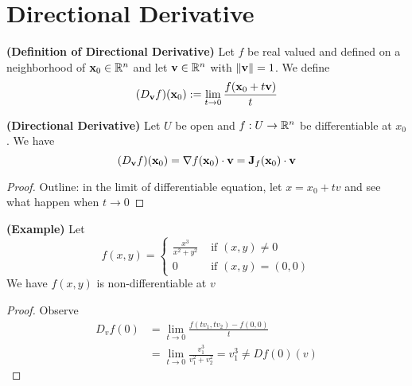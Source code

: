 \documentclass{report}
\begin{document}
\section{Directional Derivative}
\begin{definition}
\label{4.4.1}
  \textbf{(Definition of Directional Derivative)} Let $f$ be real valued and defined on a neighborhood of $\textbf{x}_0 \in\mathbb{R}^n$ and let $\textbf{v}\in\mathbb{R}^n$ with $\| \textbf{v} \|=1$. We define 
  \begin{equation}
    (D_{\textbf{v}}f)(\textbf{x}_0):=\lim_{t\to 0}\frac{f(\textbf{x}_0+t\textbf{v})}{t}
  \end{equation}
\end{definition}
\begin{theorem}
\label{4.4.2}
\textbf{(Directional Derivative)} Let $U$ be open and $f:U\rightarrow \mathbb{R}^n$ be differentiable at $x_0$. We have
 \begin{equation}
   (D_{\textbf{v}}f)(\textbf{x}_0)=\nabla f(\textbf{x}_0)\cdot \textbf{v}=\textbf{J}_f(\textbf{x}_0)\cdot \textbf{v}
\end{equation}
\end{theorem}
\begin{proof}
Outline: in the limit of differentiable equation, let $x=x_0+tv$ and see what happen when  $t \to 0$
\end{proof}
\begin{theorem}
\label{4.4.3}
\textbf{(Example)} Let
\begin{equation}
f(x,y)=\begin{cases}
  \frac{x^3}{x^2+y^2}& \text{ if  }(x,y)\neq 0\\
  0 & \text{ if  }(x,y)=(0,0)
\end{cases}
\end{equation}
We have $f(x,y)$ is non-differentiable at $v$
\end{theorem}
\begin{proof}
Observe
\begin{align}
D_vf(0)&=\lim_{t \to 0}\frac{f(tv_1,tv_2)-f(0,0)}{t}\\
&=\lim_{t\to0}\frac{v_1^3}{v_1^2+v_2^2}=v_1^3\neq Df(0)(v)
\end{align}
\end{proof}
\end{document}
